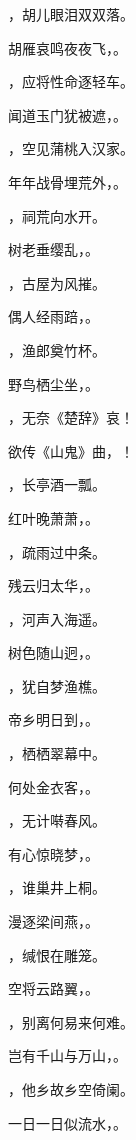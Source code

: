 \documentclass[12pt, a4paper, addpoints]{exam}
\begin{document}
\begin{questions}
\question[3] \fillin，胡儿眼泪双双落。

\question[3] 胡雁哀鸣夜夜飞，\fillin。

\question[3] \fillin，应将性命逐轻车。

\question[3] 闻道玉门犹被遮，\fillin。

\question[3] \fillin，空见蒲桃入汉家。

\question[3] 年年战骨埋荒外，\fillin。

\question[3] \fillin，祠荒向水开。

\question[3] 树老垂缨乱，\fillin。

\question[3] \fillin，古屋为风摧。

\question[3] 偶人经雨踣，\fillin。

\question[3] \fillin，渔郎奠竹杯。

\question[3] 野鸟栖尘坐，\fillin。

\question[3] \fillin，无奈《楚辞》哀！

\question[3] 欲传《山鬼》曲，\fillin！

\question[3] \fillin，长亭酒一瓢。

\question[3] 红叶晚萧萧，\fillin。

\question[3] \fillin，疏雨过中条。

\question[3] 残云归太华，\fillin。

\question[3] \fillin，河声入海遥。

\question[3] 树色随山迥，\fillin。

\question[3] \fillin，犹自梦渔樵。

\question[3] 帝乡明日到，\fillin。

\question[3] \fillin，栖栖翠幕中。

\question[3] 何处金衣客，\fillin。

\question[3] \fillin，无计啭春风。

\question[3] 有心惊晓梦，\fillin。

\question[3] \fillin，谁巢井上桐。

\question[3] 漫逐梁间燕，\fillin。

\question[3] \fillin，缄恨在雕笼。

\question[3] 空将云路翼，\fillin。

\question[3] \fillin，别离何易来何难。

\question[3] 岂有千山与万山，\fillin。

\question[3] \fillin，他乡故乡空倚阑。

\question[3] 一日一日似流水，\fillin。


\end{questions}
\end{document}
